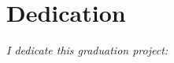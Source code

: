 \documentclass[a4paper, oneside, 12pt, final]{extreport}
\begin{document}
%



\chapter*{Dedication}
\thispagestyle{empty}

\begin{center}
\itshape
I dedicate this graduation project:
\end{center}
\end{document}
